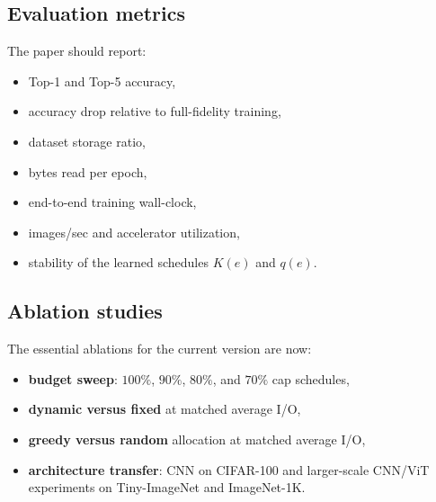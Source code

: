 \documentclass[10pt,twocolumn]{article}
\begin{document}
\subsection{Evaluation metrics}
The paper should report:
\begin{itemize}
    \item Top-1 and Top-5 accuracy,
    \item accuracy drop relative to full-fidelity training,
    \item dataset storage ratio,
    \item bytes read per epoch,
    \item end-to-end training wall-clock,
    \item images/sec and accelerator utilization,
    \item stability of the learned schedules $K(e)$ and $q(e)$.
\end{itemize}

\subsection{Ablation studies}
The essential ablations for the current version are now:
\begin{itemize}
    \item \textbf{budget sweep}: $100\%$, $90\%$, $80\%$, and $70\%$ cap schedules,
    \item \textbf{dynamic versus fixed} at matched average I/O,
    \item \textbf{greedy versus random} allocation at matched average I/O,
    \item \textbf{architecture transfer}: CNN on CIFAR-100 and larger-scale CNN/ViT experiments on Tiny-ImageNet and ImageNet-1K.
\end{itemize}
\end{document}

